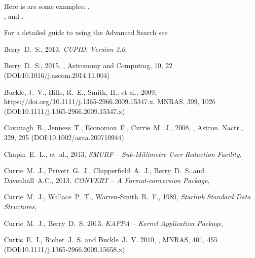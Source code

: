 \documentclass[11pt,oneside,chapters]{starlink}
\begin{document}
Here is are some examples:
, \\
, and
.

For a detailed guide to using the Advanced Search see
.


\clearpage

\begin{thebibliography}{}

Berry~D.~S., 2013, \textit{CUPID. Version 2.0}, 

Berry~D.~S., 2015, , Astronomy and Computing,
10, 22 (DOI:10.1016/j.ascom.2014.11.004)

Buckle, J.~V., Hills, R.~E., Smith, H., et al., 2009, 
{https://doi.org/10.1111/j.1365-2966.2009.15347.x}, MNRAS, 399, 1026
(DOI:10.1111/j.1365-2966.2009.15347.x)

Cavanagh~B., Jenness~T., Economou~F., Currie~M.~J., 2008,
,
Astron. Nactr., 329, 295 (DOI:10.1002/asna.200710944)

Chapin~E.~L., et~al., 2013, \textit{SMURF -- Sub-Millimetre User Reduction
Facility}, 

Currie~M.~J., Privett~G.~J., Chipperfield~A.~J., Berry~D.~S. and Davenhall~A.C., 2013,
\textit{CONVERT -- A Format-conversion Package}, 

Currie~M.~J., Wallace~P.~T., Warren-Smith~R.~F., 1989,
\textit{Starlink Standard Data Structures}, 

Currie~M.~J., Berry~D.~S, 2013, \textit{KAPPA -- Kernel Application Package},

Curtis~E.~I., Richer~J.~S. and Buckle~J.~V. 2010, ,
MNRAS, 401, 455 (DOI:10.1111/j.1365-2966.2009.15658.x)


\end{thebibliography}
\end{document}
